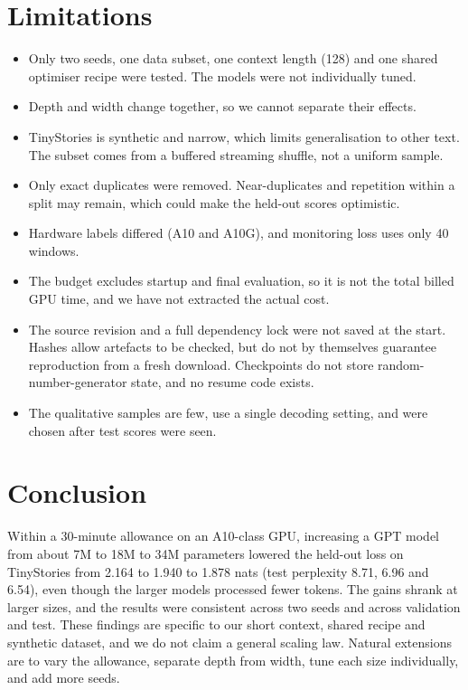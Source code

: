 \documentclass[11pt,a4paper]{article}
\begin{document}
\section{Limitations}
\begin{itemize}
  \item Only two seeds, one data subset, one context length (128) and one shared optimiser recipe were tested. The models were not individually tuned.
  \item Depth and width change together, so we cannot separate their effects.
  \item TinyStories is synthetic and narrow, which limits generalisation to other text. The subset comes from a buffered streaming shuffle, not a uniform sample.
  \item Only exact duplicates were removed. Near-duplicates and repetition within a split may remain, which could make the held-out scores optimistic.
  \item Hardware labels differed (A10 and A10G), and monitoring loss uses only 40 windows.
  \item The budget excludes startup and final evaluation, so it is not the total billed GPU time, and we have not extracted the actual cost.
  \item The source revision and a full dependency lock were not saved at the start. Hashes allow artefacts to be checked, but do not by themselves guarantee reproduction from a fresh download. Checkpoints do not store random-number-generator state, and no resume code exists.
  \item The qualitative samples are few, use a single decoding setting, and were chosen after test scores were seen.
\end{itemize}

\section{Conclusion}
Within a 30-minute allowance on an A10-class GPU, increasing a GPT model from about 7M to 18M to 34M parameters lowered the held-out loss on TinyStories from 2.164 to 1.940 to 1.878 nats (test perplexity 8.71, 6.96 and 6.54), even though the larger models processed fewer tokens. The gains shrank at larger sizes, and the results were consistent across two seeds and across validation and test. These findings are specific to our short context, shared recipe and synthetic dataset, and we do not claim a general scaling law. Natural extensions are to vary the allowance, separate depth from width, tune each size individually, and add more seeds.
\end{document}

